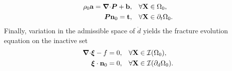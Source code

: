 \begin{subequations}
  \begin{align}
    \rho_0\textbf{a} = {\boldsymbol{\nabla} \cdot}\boldsymbol{P} + \textbf{b}, & \quad \forall \textbf{X} \in \Omega_0,           \\
    \boldsymbol{P}\textbf{n}_0 = \textbf{t},                & \quad \forall \textbf{X} \in \partial_t\Omega_0. 
  \end{align}
\end{subequations}
Finally, variation in the admissible space of $\dot{d}$ yields the fracture evolution equation on the inactive set
\begin{subequations}
  \begin{align}
    {\boldsymbol{\nabla}\cdot} \boldsymbol{\xi} - f = 0, & \quad \forall \textbf{X} \in \mathcal{I}(\Omega_0),           \\
    \boldsymbol{\xi}\cdot\textbf{n}_0 = 0,   & \quad \forall \textbf{X} \in \mathcal{I}(\partial_d\Omega_0). 
  \end{align}
\end{subequations}
